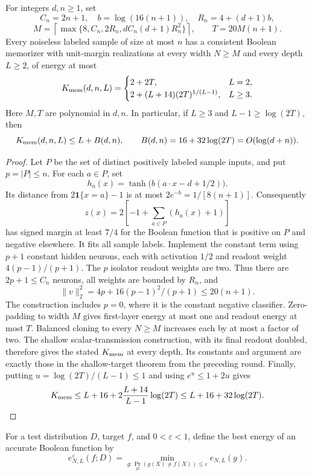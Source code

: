 \begin{lemma}
\label{lem:sample-memorizer-energy}
For integers $d,n\ge1$, set
\[
 C_n=2n+1,\quad b=\log(16(n+1)),\quad R_n=4+(d+1)b,
\]
\[
 M=\left\lceil\max\{8,C_n,2R_n,dC_n(d+1)R_n^2\}\right\rceil,
 \qquad T=20M(n+1).
\]
Every noiseless labeled sample of size at most $n$ has a consistent
Boolean memorizer with unit-margin realizations at every width $N\ge M$
and every depth $L\ge2$, of energy at most
\[
 K_{\rm mem}(d,n,L)=
 \begin{cases}
  2+2T,&L=2,\\
  2+(L+14)(2T)^{1/(L-1)},&L\ge3.
 \end{cases}
\]
Here $M,T$ are polynomial in $d,n$. In particular, if
$L\ge3$ and $L-1\ge\log(2T)$, then
\[
 K_{\rm mem}(d,n,L)\le L+B(d,n),\qquad
 B(d,n)=16+32\log(2T)=O(\log(d+n)).
\]
\end{lemma}

\begin{proof}
Let $P$ be the set of distinct positively labeled sample inputs, and put
$p=|P|\le n$. For each $a\in P$, set
\[
 h_a(x)=\tanh\bigl(b(a\cdot x-d+1/2)\bigr).
\]
Its distance from $2\mathbf1\{x=a\}-1$ is at most
$2e^{-b}=1/[8(n+1)]$. Consequently
\[
 z(x)=2\left[-1+\sum_{a\in P}(h_a(x)+1)\right]
\]
has signed margin at least $7/4$ for the Boolean function that is positive
on $P$ and negative elsewhere. It fits all sample labels.
Implement the constant term using $p+1$ constant hidden neurons, each
with activation $1/2$ and readout weight $4(p-1)/(p+1)$.
The $p$ isolator readout weights are two. Thus there are $2p+1\le C_n$
neurons, all weights are bounded by $R_n$, and
\[
 \|v\|_2^2=4p+16(p-1)^2/(p+1)\le20(n+1).
\]
The construction includes $p=0$, where it is the constant negative
classifier. Zero-padding to width $M$ gives first-layer energy at most
one and readout energy at most $T$. Balanced cloning to every $N\ge M$
increases each by at most a factor of two. The shallow scalar-transmission
construction, with its final readout doubled, therefore gives the stated
$K_{\rm mem}$ at every depth. Its constants and argument are exactly those
in the shallow-target theorem from the preceding round.
Finally, putting $u=\log(2T)/(L-1)\le1$ and using $e^u\le1+2u$ gives
\[
 K_{\rm mem}\le L+16+
       2\frac{L+14}{L-1}\log(2T)
 \le L+16+32\log(2T).
\]
\end{proof}

For a test distribution $D$, target $f$, and $0<\varepsilon<1$, define
the best energy of an accurate Boolean function by
\[
 e_{N,L}^{\varepsilon}(f;D)
 =\min_{g:\Pr_D(g(X)\ne f(X))\le\varepsilon}e_{N,L}(g).
\]

